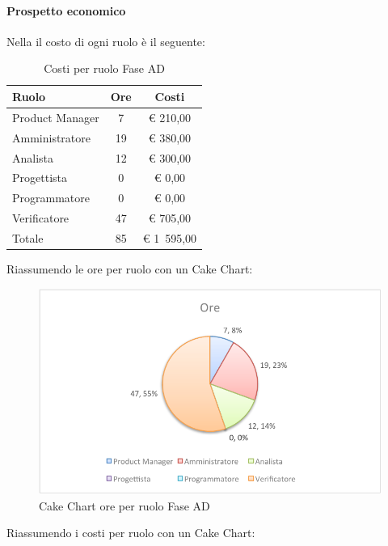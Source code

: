 			\paragraph{Prospetto economico}
				Nella  il costo di ogni ruolo è il seguente:
				\begin{table}[H]
					\begin{center}
						\begin{tabular}{| l | c | c |}
							\hline
							Ruolo 			& Ore 	& Costi  \\ \hline
							
							Product Manager	& 7 		& \euro{} 210,00 	\\
							Amministratore 		& 19 		& \euro{} 380,00 	\\
							Analista	 		& 12 		& \euro{} 300,00 	\\
							Progettista 		& 0		& \euro{} 0,00 	\\
							Programmatore		& 0		& \euro{} 0,00	\\
							Verificatore		& 47 		& \euro{} 705,00 	\\ \hline \hline
							
							Totale	 		& 85 		& \euro{} 1~595,00 	\\ \hline
						\end{tabular}
					\end{center}
					\caption{Costi per ruolo Fase AD}
				\end{table}
				Riassumendo le ore per ruolo con un Cake Chart:
				\begin{figure}[H]\centering
					\includegraphics[width=\textwidth]{PianoDiProgetto/Pics/ChartTotOreFaseAD.pdf}
					\caption{Cake Chart ore per ruolo Fase AD}
				\end{figure}
				Riassumendo i costi per ruolo con un Cake Chart:
